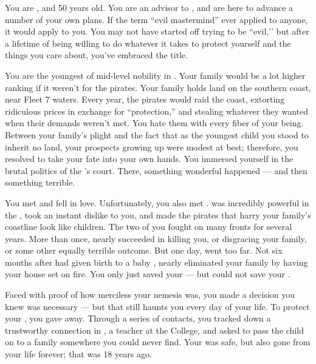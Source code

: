 \documentclass[char]{GL2020}
\begin{document}
\name{\cEvil{}}

You are \cEvil{\intro}, and 50 years old. You are an advisor to \cQueen{\intro}, and are here to advance a number of your own plans. If the term ``evil mastermind'' ever applied to anyone, it would apply to you. You may not have started off trying to be ``evil,’’ but after a lifetime of being willing to do whatever it takes to protect yourself and the things you care about, you've embraced the title.

You are the youngest \cEvil{\offspring} of mid-level nobility in \pFarm{}. Your family would be a lot higher ranking if it weren't for the pirates. Your family holds land on the southern coast, near Fleet 7 waters. Every year, the pirates would raid the coast, extorting ridiculous prices in exchange for ``protection,'' and stealing whatever they wanted when their demands weren't met. You hate them with every fiber of your being. Between your family's plight and the fact that as the youngest child you stood to inherit no land, your prospects growing up were modest at best; therefore, you resolved to take your fate into your own hands. You immersed yourself in the brutal politics of the \cQueen{\Monarch}'s court. There, something wonderful happened — and then something terrible.

You met \cPirateChildParent{} and fell in love. Unfortunately, you also met \cEvilNemesis{\intro}. \cEvilNemesis{} was incredibly powerful in the \pFarm{}, took an instant dislike to you, and made the pirates that harry your family's coastline look like children. The two of you fought on many fronts for several years. More than once, \cEvilNemesis{\they} nearly succeeded in killing you, or disgracing your family, or some other equally terrible outcome. But one day, \cEvilNemesis{\they} went too far. Not six months after \cPirateChildParent{} had given birth to a baby \cPirateChild{\child}, \cEvilNemesis{} nearly eliminated your family by having your house set on fire. You only just saved your \cPirateChild{\offspring} — but could not save your \cPirateChildParent{\spouse}.

Faced with proof of how merciless your nemesis was, you made a decision you knew was necessary — but that still haunts you every day of your life. To protect your \cPirateChild{\offspring}, you gave \cPirateChild{\them} away. Through a series of contacts, you tracked down a trustworthy connection in \cEthics{\intro}, a teacher at the College, and asked \cEthics{\them} to pass the child on to a family somewhere you could never find. Your \cPirateChild{\offspring} was safe, but \cPirateChild{\theywere} also gone from your life forever; that was 18 years ago.
\end{document}
